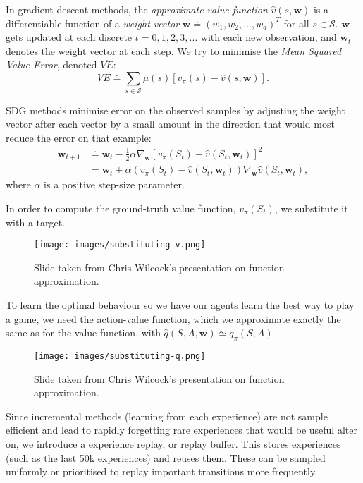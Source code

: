 \documentclass{article}
\begin{document}
In gradient-descent methods, the \textit{approximate value function} $\hat{v}(s,\mathbf{w})$ is a differentiable function of a \textit{weight vector} $\mathbf{w} \doteq (w_1, w_2, \dots, w_d)^T$ for all $s \in \mathcal{S}$. $\mathbf{w}$ gets updated at each discrete $t = 0, 1, 2, 3, \dots$ with each new observation, and $\mathbf{w}_t$ denotes the weight vector at each step. We try to minimise the \textit{Mean Squared Value Error}, denoted $\overline{VE}$: $$\overline{VE} \doteq \sum_{s \in \mathcal{S}} \mu(s) \left[ v_\pi(s) - \hat{v}(s, \mathbf{w})\right].$$

SDG methods minimise error on the observed samples by adjusting the weight vector after each vector by a small amount in the direction that would most reduce the error on that example: $$\begin{aligned} \mathbf{w}_{t+1} & \doteq \mathbf{w}_t - \frac{1}{2} \alpha \nabla_{\mathbf{w}} \left[ v_\pi(S_t) - \hat{v}(S_t, \mathbf{w}_t) \right]^2 \\ & = \mathbf{w}_t + \alpha(v_\pi(S_t) - \hat{v}(S_t, \mathbf{w}_t)) \nabla_{\mathbf{w}} \hat{v}(S_t, \mathbf{w}_t),\end{aligned}$$ where $\alpha$ is a positive step-size parameter.

In order to compute the ground-truth value function, $v_\pi(S_t)$, we substitute it with a target.

\begin{figure}[h]
  \centering
  \texttt{[image: images/substituting-v.png]}
  \caption{Slide taken from Chris Wilcock's presentation on function approximation.}
  \label{fig:substituting-v}
\end{figure}

To learn the optimal behaviour so we have our agents learn the best way to play a game, we need the action-value function, which we approximate exactly the same as for the value function, with $\hat{q}(S, A, \mathbf{w}) \simeq q_\pi(S,A)$  

\begin{figure}[h]
  \centering
  \texttt{[image: images/substituting-q.png]}
  \caption{Slide taken from Chris Wilcock's presentation on function approximation.}
  \label{fig:substituting-q}
\end{figure}

Since incremental methods (learning from each experience) are not sample efficient and lead to rapidly forgetting rare experiences that would be useful alter on, we introduce a experience replay, or replay buffer. This stores experiences (such as the last 50k experiences) and reuses them. These can be sampled uniformly or prioritised to replay important transitions more frequently.
\end{document}
